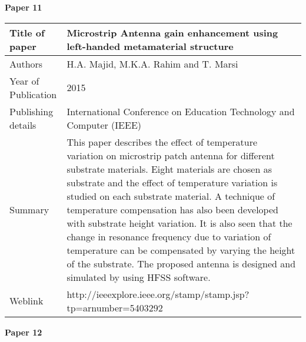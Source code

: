 		    \cleardoublepage
		    
		    	\begin{flushleft}
		    		\textbf{Paper 11}
		    	\end{flushleft}
		    	

		      \begin{center}
		      	\begin{table}[H]
		      		\centering
		      		\begin{tabular}{ |l|p{11cm}| }
		      			\hline
		      			Title of paper &  Microstrip Antenna gain enhancement using left-handed metamaterial structure \\
		      			\hline
		      			Authors & H.A. Majid, M.K.A. Rahim and T. Marsi \\
		      			\hline
		      			Year of Publication & 2015 \\
		      			\hline
		      			Publishing details & International Conference on Education Technology and Computer (IEEE) \\ \hline
		      			Summary & This paper describes the effect of temperature variation on microstrip patch antenna for different substrate materials. Eight materials are chosen as substrate and the effect of temperature variation is studied on each substrate material. A technique of temperature compensation has also been developed with substrate height variation. It is also seen that the change in resonance frequency due to variation of temperature can be compensated by varying the height of the substrate. The proposed antenna is designed and simulated by using HFSS software.\\
		      			\hline
		      			Weblink & http://ieeexplore.ieee.org/stamp/stamp.jsp?tp=arnumber=5403292 \\
		      			\hline			 
		      		\end{tabular}		
		      		
		      	\end{table}
		      \end{center}
		      
		      	\begin{flushleft}
		      		\textbf{Paper 12}
		      	\end{flushleft}
		      	

